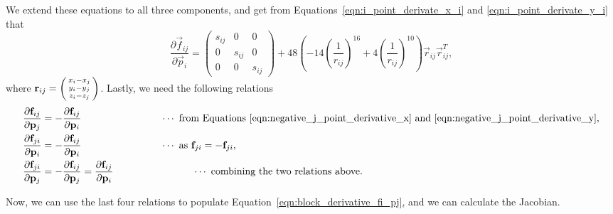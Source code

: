 \documentclass[../Main.tex]{subfiles}
\begin{document}
We extend these equations to all three components, and get from Equations~\ref{eqn:i_point_derivate_x_i} and \ref{eqn:i_point_derivate_y_i} that 
$$
\renewcommand\arraystretch{1.5}
\frac{\partial \vec{f}_{ij}}{\partial \vec{p}_{i}} = 
	\begin{pmatrix}
		s_{ij} & 0 & 0 \\
		0 & s_{ij} & 0 \\
		0 & 0 & s_{ij}
	\end{pmatrix} + 48\left(-14\left(\frac{1}{r_{ij}}\right)^{16}+ 4\left(\frac{1}{r_{ij}}\right)^{10}\right)\vec{r}_{ij}\vec{r}_{ij}^{T},
$$ where $\vec{r}_{ij} = \begin{psmallmatrix} x_{i} - x_{j} \\ y_{i} - y{_j} \\ z_{i} - z_{j}\end{psmallmatrix}$.
Lastly, we need the following relations
\begin{align*}
\frac{\partial \vec{f}_{ij}}{\partial \vec{p}_{j}} &= -\frac{\partial \vec{f}_{ij}}{\partial \vec{p}_{i}} \qquad \qquad \qquad \qquad\cdots \mbox{  from Equations \ref{eqn:negative_j_point_derivative_x} and \ref{eqn:negative_j_point_derivative_y}}, \\
\frac{\partial \vec{f}_{ji}}{\partial \vec{p}_{i}} &= -\frac{\partial \vec{f}_{ij}}{\partial \vec{p}_{i}} \qquad \qquad \qquad \qquad\cdots \mbox{  as } \vec{f}_{ji} = -\vec{f}_{ji}, \\
\frac{\partial \vec{f}_{ji}}{\partial \vec{p}_{j}} &= -\frac{\partial \vec{f}_{ij}}{\partial \vec{p}_{j}} = \frac{\partial \vec{f}_{ij}}{\partial \vec{p}_{i}} \qquad \qquad \qquad \qquad\cdots \mbox{  combining the two relations above.}
\end{align*}

Now, we can use the last four relations to populate Equation~\ref{eqn:block_derivative_fi_pj}, and we can calculate the Jacobian.
\end{document}
